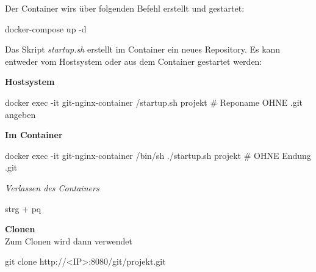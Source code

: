 \documentclass[
  ngerman,
  letterpaper,
  DIV=11]{scrreprt}
\newenvironment{Shaded}{\begin{snugshade}}{\end{snugshade}}
\newcommand{\AttributeTok}[1]{\textcolor[rgb]{0.40,0.45,0.13}{#1}}
\newcommand{\CommentTok}[1]{\textcolor[rgb]{0.37,0.37,0.37}{#1}}
\newcommand{\ExtensionTok}[1]{\textcolor[rgb]{0.00,0.23,0.31}{#1}}
\newcommand{\FunctionTok}[1]{\textcolor[rgb]{0.28,0.35,0.67}{#1}}
\newcommand{\NormalTok}[1]{\textcolor[rgb]{0.00,0.23,0.31}{#1}}
\newcommand{\OperatorTok}[1]{\textcolor[rgb]{0.37,0.37,0.37}{#1}}
\begin{document}
Der Container wirs über folgenden Befehl erstellt und gestartet:

\begin{Shaded}
\begin{Highlighting}[]
\ExtensionTok{docker{-}compose}\NormalTok{ up }\AttributeTok{{-}d}
\end{Highlighting}
\end{Shaded}

Das Skript \emph{startup.sh} erstellt im Container ein neues Repository.
Es kann entweder vom Hostsystem oder aus dem Container gestartet werden:

\textbf{Hostsystem}

\begin{Shaded}
\begin{Highlighting}[]
\ExtensionTok{docker}\NormalTok{ exec }\AttributeTok{{-}it}\NormalTok{ git{-}nginx{-}container /startup.sh projekt  }\CommentTok{\# Reponame OHNE .git angeben}
\end{Highlighting}
\end{Shaded}

\textbf{Im Container}

\begin{Shaded}
\begin{Highlighting}[]
\ExtensionTok{docker}\NormalTok{ exec }\AttributeTok{{-}it}\NormalTok{ git{-}nginx{-}container /bin/sh}
\ExtensionTok{./startup.sh}\NormalTok{ projekt  }\CommentTok{\# OHNE Endung .git}
\end{Highlighting}
\end{Shaded}

\emph{Verlassen des Containers}

\begin{Shaded}
\begin{Highlighting}[]
\ExtensionTok{strg}\NormalTok{ + pq}
\end{Highlighting}
\end{Shaded}

\textbf{Clonen}\\
Zum Clonen wird dann verwendet

\begin{Shaded}
\begin{Highlighting}[]
\FunctionTok{git}\NormalTok{ clone http://}\OperatorTok{\textless{}}\NormalTok{IP}\OperatorTok{\textgreater{}}\NormalTok{:8080/git/projekt.git}
\end{Highlighting}
\end{Shaded}
\end{document}
